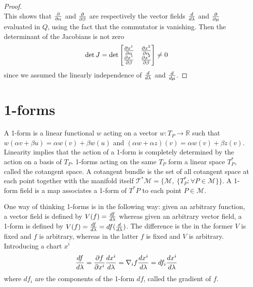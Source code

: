\begin{proof}
\begin{equation*}
    \end{equation*}
    This shows that $\frac{\partial}{\partial\alpha}$ and $\frac{\partial}{\partial\beta}$ are respectively the vector fields $\frac{d}{d\lambda}$ and $\frac{\partial}{\partial\mu}$ evaluated in $Q$, using the fact that the commutator is vanishing. Then the determinant of the Jacobians is not zero
    \begin{equation*}
        \det J = \det \begin{bmatrix}
            \frac{\partial x^1}{\partial\alpha} & \frac{\partial x^2}{\partial\alpha} \\
            \frac{\partial x^1}{\partial\beta} & \frac{\partial x^2}{\partial\beta} \\
        \end{bmatrix} \neq 0
    \end{equation*}
    since we assumed the linearly independence of $\frac{d}{d\lambda}$ and $\frac{d}{d\mu}$.
    \end{proof} 

\section{1-forms}

    A 1-form is a linear functional $w$ acting on a vector $w \colon T_P \rightarrow \mathbb R$ such that $w(\alpha v + \beta u) = \alpha w(v) + \beta w(u)$ and $(\alpha w + \alpha z)(v) = \alpha w(v) + \beta z(v)$. Linearity implies that the action of a 1-form is completely determined by the action on a basis of $T_P$. 1-forms acting on the same $T_P$ form a linear space $T^*_P$, called the cotangent space. A cotangent bundle is the set of all cotangent space at each point together with the manifold itself $\mathcal T^* \mathcal M = \{\mathcal M, ~\{T^*_P \colon \forall P \in \mathcal M \}\}$. A 1-form field is a map associates a 1-form of $T^*P$ to each point $P \in \mathcal M$.

    One way of thinking 1-forms is in the following way: given an arbitrary function, a vector field is defined by $V(f) = \frac{df}{d\lambda}$ whereas given an arbitrary vector field, a 1-form is defined by $V(f) = \frac{df}{d\lambda} = df (\frac{d}{d\lambda})$. The difference is the in the former $V$ is fixed and $f$ is arbitrary, whereas in the latter $f$ is fixed and $V$ is arbitrary. Introducing a chart $x^i$
    \begin{equation*}
        \frac{df}{d\lambda} = \frac{\partial f}{\partial x^i} \frac{dx^i}{d\lambda} = \nabla_i f \frac{dx^i}{d\lambda} = df_i \frac{dx^i}{d\lambda}
    \end{equation*}
    where $df_i$ are the components of the 1-form $df$, called the gradient of $f$.
    
